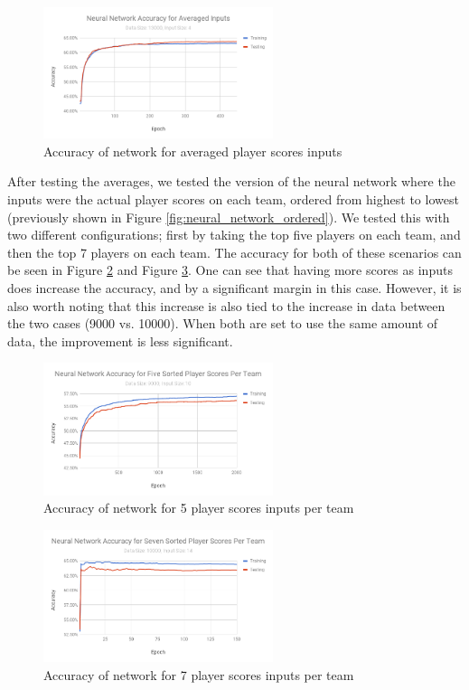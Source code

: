 \begin{figure}[ht]
    \centering
    \includegraphics[width=0.6\textwidth, frame]{figures/accuracyAveragedInputs}
    \caption{Accuracy of network for averaged player scores inputs}
    \label{fig:accuracyAveragedInputs}
\end{figure}


After testing the averages, we tested the version of the neural network where the inputs were the actual player scores on each team, ordered from highest to lowest (previously shown in Figure \ref{fig:neural_network_ordered}). We tested this with two different configurations; first by taking the top five players on each team, and then the top 7 players on each team. The accuracy for both of these scenarios can be seen in Figure \ref{fig:accuracy5Scores} and Figure \ref{fig:accuracy7Scores}. One can see that having more scores as inputs does increase the accuracy, and by a significant margin in this case. However, it is also worth noting that this increase is also tied to the increase in data between the two cases (9000 vs. 10000). When both are set to use the same amount of data, the improvement is less significant.

\begin{figure}[ht]
    \centering
    \includegraphics[width=0.6\textwidth, frame]{figures/accuracy5Scores}
    \caption{Accuracy of network for 5 player scores inputs per team}
    \label{fig:accuracy5Scores}
\end{figure}

\begin{figure}[ht]
    \centering
    \includegraphics[width=0.6\textwidth, frame]{figures/accuracy7Scores}
    \caption{Accuracy of network for 7 player scores inputs per team}
    \label{fig:accuracy7Scores}
\end{figure}

